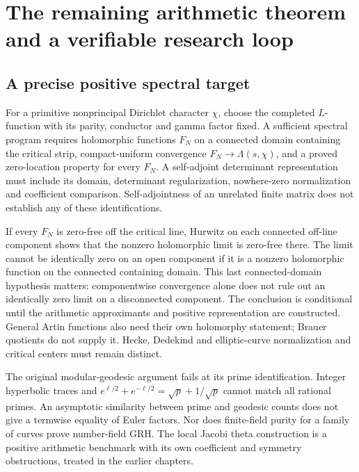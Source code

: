 \chapter{The remaining arithmetic theorem and a verifiable research loop}
\label{book:frontier}
\section{A precise positive spectral target}
For a primitive nonprincipal Dirichlet character $\chi$, choose the completed $L$-function with its parity, conductor and gamma factor fixed. A sufficient spectral program requires holomorphic functions $F_N$ on a connected domain containing the critical strip, compact-uniform convergence $F_N\to\Lambda(s,\chi)$, and a proved zero-location property for every $F_N$. A self-adjoint determinant representation must include its domain, determinant regularization, nowhere-zero normalization and coefficient comparison. Self-adjointness of an unrelated finite matrix does not establish any of these identifications.

If every $F_N$ is zero-free off the critical line, Hurwitz on each connected off-line component shows that the nonzero holomorphic limit is zero-free there. The limit cannot be identically zero on an open component if it is a nonzero holomorphic function on the connected containing domain. This last connected-domain hypothesis matters: componentwise convergence alone does not rule out an identically zero limit on a disconnected component. The conclusion is conditional until the arithmetic approximants and positive representation are constructed. General Artin functions also need their own holomorphy statement; Brauer quotients do not supply it. Hecke, Dedekind and elliptic-curve normalization and critical centers must remain distinct.

The original modular-geodesic argument fails at its prime identification. Integer hyperbolic traces and $e^{\ell/2}+e^{-\ell/2}=\sqrt p+1/\sqrt p$ cannot match all rational primes. An asymptotic similarity between prime and geodesic counts does not give a termwise equality of Euler factors. Nor does finite-field purity for a family of curves prove number-field GRH. The local Jacobi theta construction is a positive arithmetic benchmark with its own coefficient and symmetry obstructions, treated in the earlier chapters.

